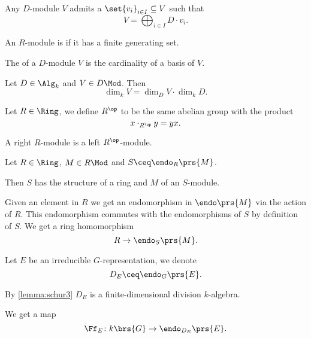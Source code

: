 \documentclass[10pt,a4paper,twoside,openany,hidelinks]{book}
\begin{document}
\begin{remark}
Any $D$-module $V$ admits a  $\set{v_i}_{i \in I} \subseteq V$ such that
\[V = \bigoplus_{i \in I} D \cdot v_i \text{.}\]
\end{remark}

\begin{definition}
An $R$-module is  if it has a finite generating set.
\end{definition}

\begin{definition}
The  of a $D$-module $V$ is the cardinality of a basis of $V$.
\end{definition}

\begin{proposition}
Let $D \in \Alg_k$ and $V \in D\Mod$. Then
\[\dim_k V = \dim_D V \cdot \dim_k D \text{.}\]
\end{proposition}

\begin{definition}
Let $R \in \Ring$, we define $R^\op$ to be the same abelian group with the product
\[x \cdot_{R^\op} y = yx \text{.}\]
\end{definition}

\begin{definition}
A right $R$-module is a left $R^\op$-module.
\end{definition}

Let $R \in \Ring$, $M \in R\Mod$ and $S \ceq \endo_R\prs{M}$.

Then $S$ has the structure of a ring and $M$ of an $S$-module.

Given an element in $R$ we get an endomorphism in $\endo\prs{M}$ via the action of $R$. This endomorphism commutes with the endomorphisms of $S$ by definition of $S$.
We get a ring homomorphism
\[R \to \endo_S\prs{M} \text{.}\]

\begin{notation}
Let $E$ be an irreducible $G$-representation, we denote
\[D_E \ceq \endo_G\prs{E} \text{.}\]
\end{notation}

\begin{remark}
By \ref{lemma:schur3} $D_E$ is a finite-dimensional division $k$-algebra.
\end{remark}

\begin{remark}
We get a map
\[\Ff_E \colon k\brs{G} \to \endo_{D_E} \prs{E} \text{.}\]
\end{remark}
\end{document}
